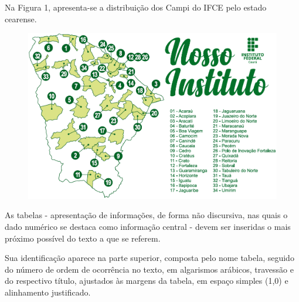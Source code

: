 Na Figura 1, apresenta-se a distribuição dos Campi do IFCE pelo estado cearense.

\begin{figure}[!ht]
\centering
\label{campi}
\includegraphics[scale=0.5]{figuras/ifce-estado}
\end{figure}

\newpage


As tabelas - apresentação de informações, de forma não discursiva, nas quais o dado numérico se destaca como informação central - devem ser inseridas o mais próximo possível do texto a que se referem.

Sua identificação aparece na parte superior, composta pelo nome tabela, seguido do número de ordem de ocorrência no texto, em algarismos arábicos, travessão e do respectivo título, ajustados às margens da tabela, em espaço simples (1,0) e alinhamento justificado.

